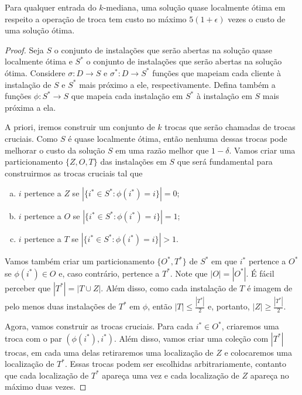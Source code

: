 \begin{theorem}
    Para qualquer entrada do $k$-mediana, uma solução quase localmente ótima em respeito a operação de troca tem custo no máximo $5(1+\epsilon)$ vezes o custo de uma solução ótima.
\end{theorem}
\begin{proof}
Seja $S$ o conjunto de instalações que serão abertas na solução quase localmente ótima e $S^*$ o conjunto de instalações que serão abertas na solução ótima. Considere $\sigma: D\rightarrow S$ e $\sigma^* : D \rightarrow S^*$ funções que mapeiam cada cliente à instalação de $S$ e $S^*$ mais próximo a ele, respectivamente. Defina também a funções $\phi : S^* \rightarrow S$ que mapeia cada instalação em $S^*$ à instalação em $S$ mais próxima a ela.

A priori, iremos construir um conjunto de $k$ trocas que serão chamadas de trocas cruciais. Como $S$ é quase localmente ótima, então nenhuma dessas trocas pode melhorar o custo da solução $S$ em uma razão melhor que $ 1- \delta$. Vamos criar uma particionamento $\{Z,O,T\}$ das instalações em $S$ que será fundamental para construirmos as trocas cruciais tal que
\begin{enumerate}[a.]
\item $i$ pertence a $Z$ se $|\{i^* \in S^* : \phi(i^*) = i\}| = 0$;
\item $i$ pertence a $O$ se $|\{i^* \in S^* : \phi(i^*) = i\}| = 1$;
\item $i$ pertence a $T$ se $|\{i^* \in S^* : \phi(i^*) = i\}| > 1$.
\end{enumerate}
Vamos também criar um particionamento $\{O^*,T^*\}$ de $S^*$ em que $i^*$ pertence a $O^*$ se $\phi(i^*) \in O$ e, caso contrário, pertence a $T^*$. Note que $|O| = |O^*|$. É fácil perceber que $|T^*| = |T\cup Z|$. Além disso, como cada instalação de $T$ é imagem de pelo menos duas instalações de $T^*$ em $\phi$, então $|T| \leq \frac{|T^*|}{2}$ e, portanto, $|Z| \geq \frac{|T^*|}{2}$.

Agora, vamos construir as trocas cruciais. Para cada $i^* \in O^*$, criaremos uma troca com o par $(\phi(i^*),i^*)$. Além disso, vamos criar uma coleção com $|T^*|$ trocas, em cada uma delas retiraremos uma localização de $Z$ e colocaremos uma localização de $T^*$. Essas trocas podem ser escolhidas arbitrariamente, contanto que cada localização de $T^*$ apareça uma vez e cada localização de $Z$ apareça no máximo duas vezes.


\end{proof}

